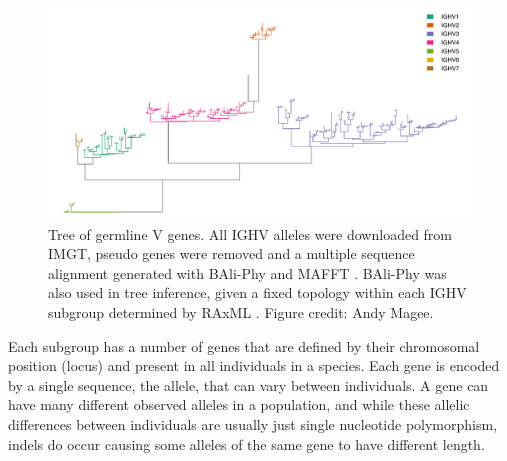 \begin{figure}
    \centering
    \includegraphics[width=1\textwidth]{figures/tree_right_side_up.pdf}
    \caption{
        \label{fig:IGHV_tree}
        Tree of germline V genes.
        All IGHV alleles were downloaded from IMGT, pseudo genes were removed and a multiple sequence alignment generated with BAli-Phy \cite{suchard2006bali} and MAFFT \cite{katoh2013mafft}.
        BAli-Phy was also used in tree inference, given a fixed topology within each IGHV subgroup determined by RAxML \cite{stamatakis2008rapid}.
        Figure credit: Andy Magee.
    }
\end{figure}


Each subgroup has a number of genes that are defined by their chromosomal position (locus) and present in all individuals in a species.
Each gene is encoded by a single sequence, the allele, that can vary between individuals.
A gene can have many different observed alleles in a population, and while these allelic differences between individuals are usually just single nucleotide polymorphism, indels do occur causing some alleles of the same gene to have different length.









